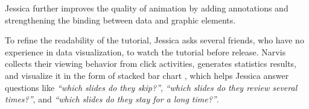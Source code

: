 Jessica further improves the quality of animation by adding annotations and strengthening the binding between data and graphic elements. 


To refine the readability of the tutorial, Jessica asks several friends, who have no experience in data visualization, to watch the tutorial before release. Narvis collects their viewing behavior from click activities, generates statistics results, and visualize it in the form of stacked bar chart , which helps Jessica answer questions like \textit{``which slides do they skip?''}, \textit{``which slides do they review several times?''}, and \textit{``which slides do they stay for a long time?''}.





